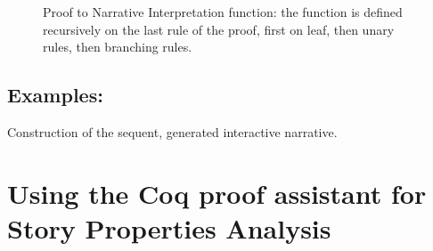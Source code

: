 \documentclass[runningheads,a4paper]{llncs}
\begin{document}
\begin{figure}
\caption{Proof to Narrative Interpretation function: the function is defined recursively on the last rule of the proof, first on leaf, then unary rules, then branching rules.\label{fig:interpretation}}
\end{figure}
\subsection{Examples:} Construction of the sequent, generated interactive narrative.
\section{Using the Coq proof assistant for Story Properties Analysis}
\end{document}
